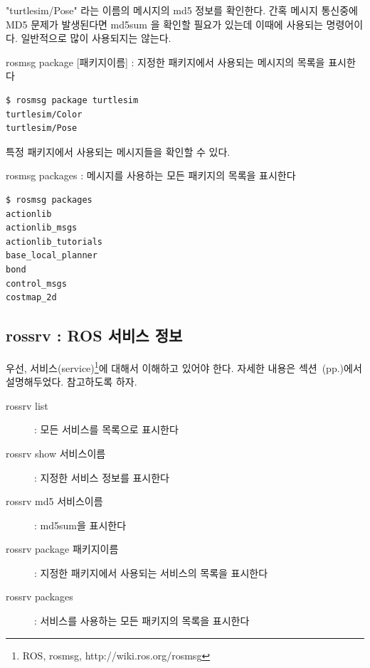 \noindent
"turtlesim/Pose" 라는 이름의 메시지의 md5 정보를 확인한다. 간혹 메시지 통신중에 MD5 문제가 발생된다면 md5sum 을 확인할 필요가 있는데 이때에 사용되는 명령어이다. 일반적으로 많이 사용되지는 않는다.

\vspace{\baselineskip}
\noindent
{}\circled{\thenum} rosmsg package [패키지이름] : 지정한 패키지에서 사용되는 메시지의 목록을 표시한다

\begin{lstlisting}[language=ROS]
$ rosmsg package turtlesim 
turtlesim/Color
turtlesim/Pose
\end{lstlisting}

\noindent
특정 패키지에서 사용되는 메시지들을 확인할 수 있다.

\vspace{\baselineskip}
\noindent
{}\circled{\thenum} rosmsg packages : 메시지를 사용하는 모든 패키지의 목록을 표시한다

\begin{lstlisting}[language=ROS]
$ rosmsg packages
actionlib
actionlib_msgs
actionlib_tutorials
base_local_planner
bond
control_msgs
costmap_2d
\end{lstlisting}

\subsection{rossrv : ROS 서비스 정보}

우선, 서비스(service)\footnote{ROS, rosmsg, http://wiki.ros.org/rosmsg}에 대해서 이해하고 있어야 한다. 자세한 내용은 섹션~(pp.\pageref{def:RosService})에서 설명해두었다. 참고하도록 하자.

\vspace{\baselineskip}
\noindent
\begin{description}
\item[rossrv list] : 모든 서비스를 목록으로 표시한다
\item[rossrv show 서비스이름] : 지정한 서비스 정보를 표시한다
\item[rossrv md5 서비스이름] : md5sum을 표시한다
\item[rossrv package 패키지이름] : 지정한 패키지에서 사용되는 서비스의 목록을 표시한다
\item[rossrv packages] : 서비스를 사용하는 모든 패키지의 목록을 표시한다
\end{description}

